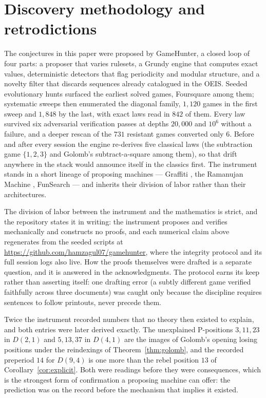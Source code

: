 \section{Discovery methodology and retrodictions}\label{sec:method}
The conjectures in this paper were proposed by GameHunter, a closed loop
of four parts: a proposer that varies rulesets, a Grundy engine that
computes exact values, deterministic detectors that flag periodicity and
modular structure, and a novelty filter that discards sequences already
catalogued in the OEIS. Seeded evolutionary hunts surfaced the earliest
solved games, Foursquare among them; systematic sweeps then enumerated
the diagonal family, $1{,}120$ games in the first sweep and $1{,}848$ by
the last, with exact laws read in $842$ of them. Every law survived six
adversarial verification passes at depths $20{,}000$ and $10^6$ without a
failure, and a deeper rescan of the $731$ resistant games converted only
$6$. Before and after every session the engine re-derives five classical
laws (the subtraction game $\{1, 2, 3\}$ and Golomb's
subtract-a-square among them), so that drift anywhere in the stack
would announce itself in the classics first. The instrument stands in a
short lineage of proposing machines --- Graffiti \cite{graffiti}, the
Ramanujan Machine \cite{ramanujan-machine}, FunSearch \cite{funsearch}
--- and inherits their division of labor rather than their
architectures.

The division of labor between the instrument and the mathematics is
strict, and the repository states it in writing: the instrument proposes
and verifies mechanically and constructs no proofs, and each numerical
claim above regenerates from the seeded scripts at
\url{https://github.com/hamzagul07/gamehunter}, where the integrity
protocol and its full session logs also live. How the proofs themselves
were drafted is a separate question, and it is answered in the
acknowledgments. The protocol earns its keep
rather than asserting itself: one drafting error (a subtly different
game verified faithfully across three documents) was caught only
because the discipline requires sentences to follow printouts, never
precede them.

Twice the instrument recorded numbers that no theory then existed to
explain, and both entries were later derived exactly. The unexplained
P-positions $3, 11, 23$ in $D(2,1)$ and $5, 13, 37$ in $D(4,1)$ are the
images of Golomb's opening losing positions under the reindexings of
Theorem~\ref{thm:golomb}, and the recorded preperiod $14$ for $D(9,4)$ is
one more than the rebel position $13$ of
Corollary~\ref{cor:explicit}. Both were readings before they were
consequences, which is the strongest form of confirmation a proposing
machine can offer: the prediction was on the record before the mechanism
that implies it existed.

